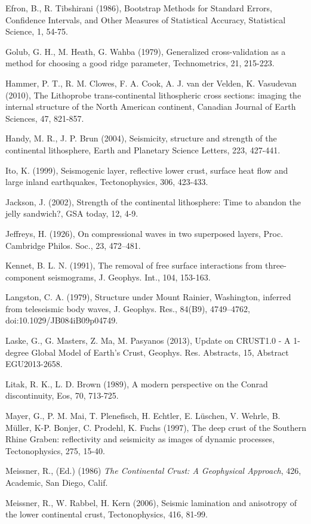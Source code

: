 \documentclass[draft, 12pt]{article}
\begin{document}
Efron, B., R. Tibshirani (1986), Bootstrap Methods for Standard Errors, Confidence Intervals, and Other Measures of Statistical Accuracy, Statistical Science, 1, 54-75.

Golub, G. H., M. Heath, G. Wahba (1979), Generalized cross-validation as a method for choosing a good ridge parameter, Technometrics, 21, 215-223.

Hammer, P. T., R. M. Clowes, F. A. Cook, A. J. van der Velden, K. Vasudevan (2010), The Lithoprobe trans-continental lithospheric cross sections: imaging the internal structure of the North American continent, Canadian Journal of Earth Sciences, 47, 821-857.

Handy, M. R.,  J. P. Brun (2004), Seismicity, structure and strength of the continental lithosphere, Earth and Planetary Science Letters, 223, 427-441.

Ito, K. (1999), Seismogenic layer, reflective lower crust, surface heat flow and large inland earthquakes, Tectonophysics, 306, 423-433.

Jackson, J. (2002), Strength of the continental lithosphere: Time to abandon the jelly sandwich?, GSA today, 12, 4-9.

Jeffreys, H. (1926), On compressional waves in two superposed layers, Proc. Cambridge Philos. Soc., 23, 472–481.

Kennet, B. L. N. (1991), The removal of free surface interactions from three-component seismograms, J. Geophys. Int., 104, 153-163.

Langston, C. A. (1979), Structure under Mount Rainier, Washington, inferred from teleseismic body waves, J. Geophys. Res., 84(B9), 4749–4762, doi:10.1029/JB084iB09p04749.

Laske, G., G. Masters, Z. Ma, M. Pasyanos (2013), Update on CRUST1.0 - A 1-degree Global Model of Earth's Crust, Geophys. Res. Abstracts, 15, Abstract EGU2013-2658.

Litak, R. K., L. D. Brown (1989), A modern perspective on the Conrad discontinuity, Eos, 70, 713-725.

Mayer, G., P. M. Mai, T. Plenefisch, H. Echtler, E. Lüschen, V. Wehrle, B. Müller, K-P. Bonjer, C. Prodehl, K. Fuchs (1997), The deep crust of the Southern Rhine Graben: reflectivity and seismicity as images of dynamic processes, Tectonophysics, 275, 15-40.

Meissner, R., (Ed.) (1986) {\it The Continental Crust: A Geophysical Approach}, 426, Academic, San Diego, Calif.

Meissner, R., W. Rabbel, H. Kern (2006), Seismic lamination and anisotropy of the lower continental crust, Tectonophysics, 416, 81-99.
\end{document}
